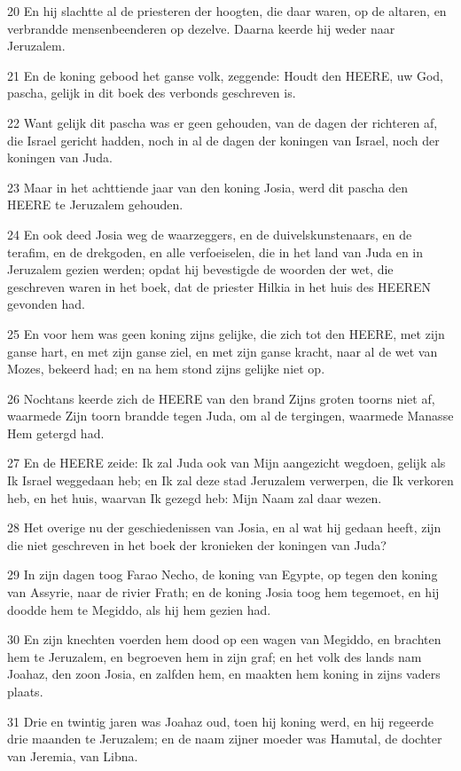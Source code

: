 \par 20 En hij slachtte al de priesteren der hoogten, die daar waren, op de altaren, en verbrandde mensenbeenderen op dezelve. Daarna keerde hij weder naar Jeruzalem.
\par 21 En de koning gebood het ganse volk, zeggende: Houdt den HEERE, uw God, pascha, gelijk in dit boek des verbonds geschreven is.
\par 22 Want gelijk dit pascha was er geen gehouden, van de dagen der richteren af, die Israel gericht hadden, noch in al de dagen der koningen van Israel, noch der koningen van Juda.
\par 23 Maar in het achttiende jaar van den koning Josia, werd dit pascha den HEERE te Jeruzalem gehouden.
\par 24 En ook deed Josia weg de waarzeggers, en de duivelskunstenaars, en de terafim, en de drekgoden, en alle verfoeiselen, die in het land van Juda en in Jeruzalem gezien werden; opdat hij bevestigde de woorden der wet, die geschreven waren in het boek, dat de priester Hilkia in het huis des HEEREN gevonden had.
\par 25 En voor hem was geen koning zijns gelijke, die zich tot den HEERE, met zijn ganse hart, en met zijn ganse ziel, en met zijn ganse kracht, naar al de wet van Mozes, bekeerd had; en na hem stond zijns gelijke niet op.
\par 26 Nochtans keerde zich de HEERE van den brand Zijns groten toorns niet af, waarmede Zijn toorn brandde tegen Juda, om al de tergingen, waarmede Manasse Hem getergd had.
\par 27 En de HEERE zeide: Ik zal Juda ook van Mijn aangezicht wegdoen, gelijk als Ik Israel weggedaan heb; en Ik zal deze stad Jeruzalem verwerpen, die Ik verkoren heb, en het huis, waarvan Ik gezegd heb: Mijn Naam zal daar wezen.
\par 28 Het overige nu der geschiedenissen van Josia, en al wat hij gedaan heeft, zijn die niet geschreven in het boek der kronieken der koningen van Juda?
\par 29 In zijn dagen toog Farao Necho, de koning van Egypte, op tegen den koning van Assyrie, naar de rivier Frath; en de koning Josia toog hem tegemoet, en hij doodde hem te Megiddo, als hij hem gezien had.
\par 30 En zijn knechten voerden hem dood op een wagen van Megiddo, en brachten hem te Jeruzalem, en begroeven hem in zijn graf; en het volk des lands nam Joahaz, den zoon Josia, en zalfden hem, en maakten hem koning in zijns vaders plaats.
\par 31 Drie en twintig jaren was Joahaz oud, toen hij koning werd, en hij regeerde drie maanden te Jeruzalem; en de naam zijner moeder was Hamutal, de dochter van Jeremia, van Libna.
